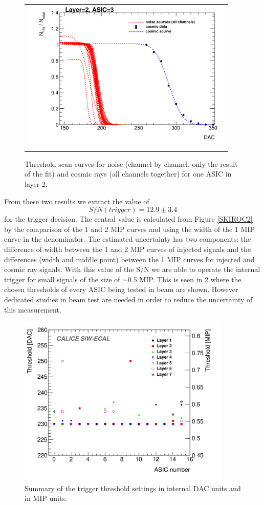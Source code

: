 \documentclass[a4paper,11pt]{article}
\begin{document}
\begin{figure}[!ht]
    \centering
  \begin{tabular}{l}
	\includegraphics[width=4in]{cosmic_scurves_asic3_layer2-eps-converted-to.pdf} 
	\end{tabular}
\caption{Threshold scan curves for noise (channel by channel, only the result of the fit) and cosmic rays (all channels together) for one ASIC in layer 2.}
\label{scurves_cosmics}
\end{figure}

From these two results we extract the value of
\begin{equation}
  S/N(trigger)=12.9\pm3.4
\end{equation}
for the trigger decision. The central value is calculated from Figure \ref{SKIROC2} by
the comparison of the 1 and 2 MIP curves and using the width of the 1 MIP curve in the denominator.
 The estimated
uncertainty has two components: the difference of width between the 1 and 2 MIP curves of injected signals and the differences (width and middle point) between the 1 MIP curves for injected and
cosmic ray signals. With this value of the 
S/N we are able to operate the internal trigger for small signals of the size of $\sim0.5$ MIP.
This is seen in \ref{trigger_thresholds} where the chosen thresholds of every ASIC being tested
in beam are shown. However dedicated studies in beam test are needed in order to
reduce the uncertainty of this measurement.

\begin{figure}[!t]
  \centering
  \includegraphics[width=4in]{threshold_chip-eps-converted-to.pdf}
  \caption{Summary of the trigger threshold settings in internal DAC units and in MIP units.}
\label{trigger_thresholds}
\end{figure}
\end{document}
